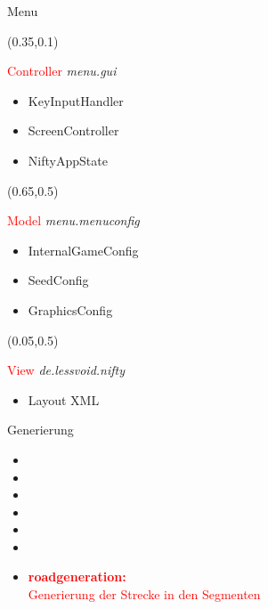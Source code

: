 \documentclass[10pt]{beamer}
\begin{document}
\begin{frame}[fragile]{Menu}
    \setlength{\TPHorizModule}{\textwidth}
    \setlength{\TPVertModule}{\textwidth}
   
    \begin{textblock}{0.5}(0.35,0.1)
            \begin{block}{\textcolor{red}{Controller}}
                \textit{menu.gui}
                \begin{itemize}
                    \item KeyInputHandler
                    \item ScreenController
                    \item NiftyAppState
                \end{itemize}
            \end{block}
    \end{textblock}

    \begin{textblock}{0.5}(0.65,0.5)
            \begin{block}{\textcolor{red}{Model}}
                \textit{menu.menuconfig}
                \begin{itemize}
                    \item InternalGameConfig
                    \item SeedConfig
                    \item GraphicsConfig
                \end{itemize}
            \end{block}
    \end{textblock}

    \begin{textblock}{0.5}(0.05,0.5)
            \begin{block}{\textcolor{red}{View}}
                \textit{de.lessvoid.nifty}
                \begin{itemize}
                    \item Layout XML
                \end{itemize}
            \end{block}
    \end{textblock}
\end{frame}



\begin{frame}[fragile]{Generierung}
    \begin{itemize}
        \item[]
        \item[]
        \item[]
        \item[]
        \item[]
        \item[]
        \item \textcolor{red}{\textbf{roadgeneration:}\\Generierung der Strecke in den Segmenten}
    \end{itemize}
\end{frame}
\end{document}
